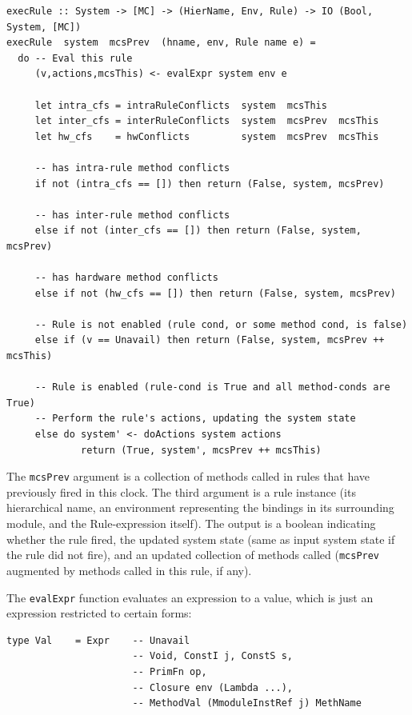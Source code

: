 \documentclass[11pt]{article}
\newcommand{\term}[1]{\texttt{#1}}
\begin{document}
\begin{Verbatim}[frame=single, commandchars=\\\{\}]
execRule :: System -> [MC] -> (HierName, Env, Rule) -> IO (Bool, System, [MC])
execRule  system  mcsPrev  (hname, env, Rule name e) =
  do -- Eval this rule
     (v,actions,mcsThis) <- evalExpr system env e

     let intra_cfs = intraRuleConflicts  system  mcsThis
     let inter_cfs = interRuleConflicts  system  mcsPrev  mcsThis
     let hw_cfs    = hwConflicts         system  mcsPrev  mcsThis

     -- has intra-rule method conflicts
     if not (intra_cfs == []) then return (False, system, mcsPrev)

     -- has inter-rule method conflicts
     else if not (inter_cfs == []) then return (False, system, mcsPrev)

     -- has hardware method conflicts
     else if not (hw_cfs == []) then return (False, system, mcsPrev)

     -- Rule is not enabled (rule cond, or some method cond, is false)
     else if (v == Unavail) then return (False, system, mcsPrev ++ mcsThis)

     -- Rule is enabled (rule-cond is True and all method-conds are True)
     -- Perform the rule's actions, updating the system state
     else do system' <- doActions system actions
             return (True, system', mcsPrev ++ mcsThis)
\end{Verbatim}

The \term{mcsPrev} argument is a collection of methods called in rules
that have previously fired in this clock.  The third argument is a
rule instance (its hierarchical name, an environment representing the
bindings in its surrounding module, and the Rule-expression itself).
The output is a boolean indicating whether the rule fired, the updated
system state (same as input system state if the rule did not fire),
and an updated collection of methods called (\term{mcsPrev} augmented
by methods called in this rule, if any).

The \term{evalExpr} function evaluates an expression to a value, which
is just an expression restricted to certain forms:

\begin{Verbatim}[frame=single, commandchars=\\\{\}]
type Val    = Expr    -- Unavail
                      -- Void, ConstI j, ConstS s,
                      -- PrimFn op,
                      -- Closure env (Lambda ...),
                      -- MethodVal (MmoduleInstRef j) MethName
\end{Verbatim}
\end{document}
